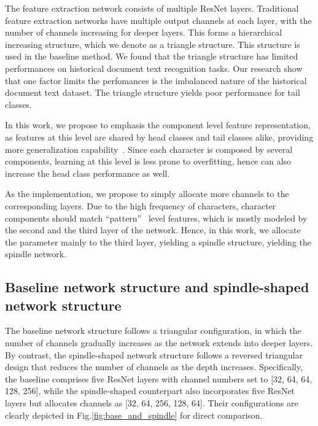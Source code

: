 The feature extraction network consists of multiple ResNet layers. Traditional feature extraction networks have multiple output channels at each layer, with the number of channels increasing for deeper layers. This forms a hierarchical increasing structure, which we denote as a triangle structure. This structure is used in the baseline method. We found that the triangle structure has limited performances on historical document text recognition tasks. Our research show that one factor limits the perfomances is the imbalanced nature of the historical document text dataset.
The triangle structure yields poor performance for tail classes. 

In this work, we propose to emphasis the component level feature representation, as features at this level are shared by head classes and tail classes alike, providing more generalization capability~\cite{sanicdar23,fudanvi}.
Since each character is composed by several components, learning at this level is less prone to overfitting, hence can also increase the head class performance as well.

As the implementation, we propose to simply allocate more channels to the corresponding layers. Due to the high frequency of characters, character components should match ``pattern''~\cite{dissection} level features, which is mostly modeled by the second and the third layer of the network.
Hence, in this work, we allocate the parameter mainly to the third layer, yielding a spindle structure, yielding the spindle network.




\subsection{Baseline network structure and spindle-shaped network structure}
The baseline network structure follows a triangular configuration, in which the number of channels gradually increases as the network extends into deeper layers. By contrast, the spindle-shaped network structure follows a reversed triangular design that reduces the number of channels as the depth increases. Specifically, the baseline comprises five ResNet layers with channel numbers set to [32, 64, 64, 128, 256], while the spindle-shaped counterpart also incorporates five ResNet layers but allocates channels as [32, 64, 256, 128, 64]. Their configurations are clearly depicted in Fig.\ref{fig:base_and_spindle} for direct comparison.

